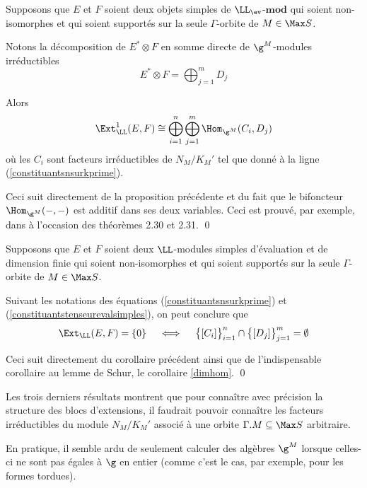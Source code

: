 \begin{Cor} \label{nsurkprimepourext} Supposons que $E$ et $F$ soient deux objets simples de $\LL_{\ev}$-$\mathbf{mod}$ qui soient non-isomorphes et qui soient supportés sur la seule $\Gamma$-orbite de $M \in \Max S$. 

Notons la décomposition de $E^* \otimes F$ en somme directe de $\g^M$-modules irréductibles
\begin{equation} \label{constituantstenseurevalsimples}
E^* \otimes F = \bigoplus_{j=1}^m D_j
\end{equation}

Alors
$$ \Ext_\LL^1(E,F) \cong \bigoplus_{i=1}^n \bigoplus_{j=1}^m \Hom_{\g^M}(C_i,D_j) $$
où les $C_i$ sont facteurs irréductibles de $N_M/K_M'$ tel que donné à la ligne (\ref{constituantsnsurkprime}).
\begin{pre} Ceci suit directement de la proposition précédente et du fait que le bifoncteur $\Hom_{\g^M}(-,-)$ est additif dans ses deux variables. Ceci est prouvé, par exemple, dans \cite{Rotman} à l'occasion des théorèmes 2.30 et 2.31. \qed  
\end{pre}
\end{Cor}

\begin{Cor} Supposons que $E$ et $F$ soient deux $\LL$-modules simples d'évaluation et de dimension finie qui soient non-isomorphes et qui soient supportés sur la seule $\Gamma$-orbite de $M \in \Max S$.

Suivant les notations des équations (\ref{constituantsnsurkprime}) et (\ref{constituantstenseurevalsimples}), on peut conclure que
$$ \Ext_\LL(E,F) = \{0\} \quad\; \Longleftrightarrow \;\quad \big\{[C_i]\big\}_{i=1}^n \cap \big\{[D_j]\big\}_{j=1}^m = \emptyset $$
\begin{pre} Ceci suit directement du corollaire précédent ainsi que de l'indispensable corollaire au lemme de Schur, le corollaire \ref{dimhom}. \qed
\end{pre}
\end{Cor}

\begin{Rem} Les trois derniers résultats montrent que pour connaître avec précision la structure des blocs d'extensions, il faudrait pouvoir connaître les facteurs irréductibles du module $N_M/K_M'$ associé à une orbite $\Gamma.M \subseteq \Max S$ arbitraire. 

En pratique, il semble ardu de seulement calculer des algèbres $\g^M$ lorsque celles-ci ne sont pas égales à $\g$ en entier (comme c'est le cas, par exemple, pour les formes tordues).
\end{Rem}

